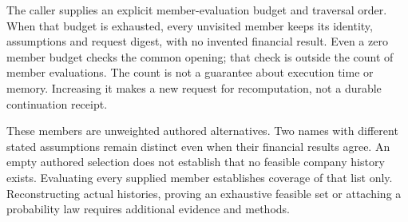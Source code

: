 The caller supplies an explicit member-evaluation budget and traversal order.
When that budget is exhausted, every unvisited member keeps its identity,
assumptions and request digest, with no invented financial result. Even a zero
member budget checks the common opening; that check is outside the count of
member evaluations. The count is not a guarantee about execution time or
memory. Increasing it makes a new request for recomputation, not a durable
continuation receipt.

These members are unweighted authored alternatives. Two names with different
stated assumptions remain distinct even when their financial results agree.
An empty authored selection does not establish that no feasible company
history exists. Evaluating every supplied member establishes coverage of that
list only. Reconstructing actual histories, proving an exhaustive feasible set
or attaching a probability law requires additional evidence and methods.

